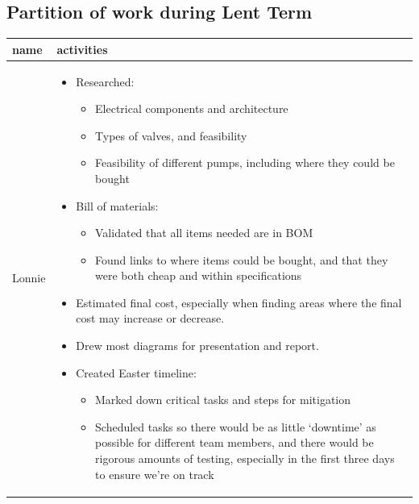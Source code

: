 \documentclass[10pt, a4paper]{article}
\begin{document}
\subsection{Partition of work during Lent Term}

\begin{table}[H]
    \small
    \centering
    \begin{tabularx}{\linewidth}{>{\raggedright\arraybackslash}p{1.5cm} X}
        \toprule
        \textbf{name} & \textbf{activities}                                                                                                                                                               \\

        \midrule
        Lonnie
                      & \begin{itemize}[nosep, leftmargin=*]
                            \item Researched:
                                  \begin{itemize}[nosep, leftmargin=*]
                      \item Electrical components and architecture
                      \item Types of valves, and feasibility
                      \item Feasibility of different pumps, including where they could be bought
                  \end{itemize}
                            \item Bill of materials:
                                  \begin{itemize}[nosep, leftmargin=*]
                      \item Validated that all items needed are in BOM
                      \item Found links to where items could be bought, and that they were both cheap and within specifications
                  \end{itemize}
                            \item Estimated final cost, especially when finding areas where the final cost may increase or decrease.
                            \item Drew most diagrams for presentation and report.
                            \item Created Easter timeline:
                                  \begin{itemize}[nosep, leftmargin=*]
                      \item Marked down critical tasks and steps for mitigation
                      \item Scheduled tasks so there would be as little `downtime' as possible for different team members, and there would be rigorous amounts of testing, especially in the first three days to ensure we're on track
                  \end{itemize}
                        \end{itemize}                                                                           \\


\end{tabularx}
\end{table}
\end{document}
